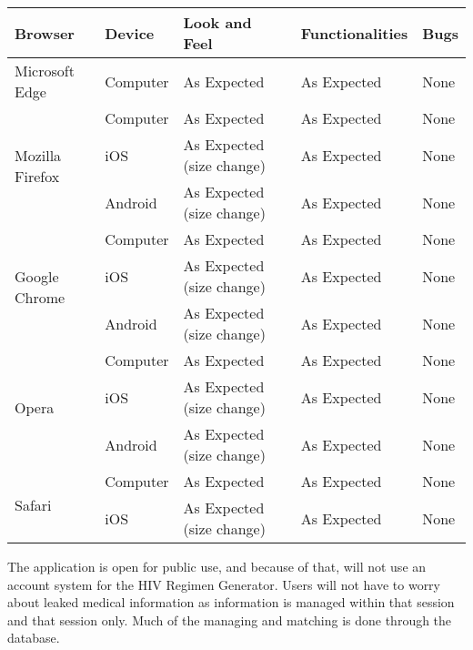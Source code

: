 \documentclass[12pt]{article}
\begin{document}
\begin{center}
    \begin{tabular}{ | l | p{3cm} | p{3cm} | p{3cm} | p{1.5cm} |}
    \hline
    \textbf{Browser} & \textbf{Device} & \textbf{Look and Feel} & \textbf{Functionalities} & \textbf{Bugs} \\ \hline
 Microsoft Edge & Computer & As Expected & As Expected & None \\ \hline

\multirow{3}{*}{Mozilla Firefox}
 & Computer & As Expected & As Expected & None \\
 & iOS & As Expected (size change) & As Expected & None \\
 & Android & As Expected (size change) & As Expected & None \\ \hline

\multirow{3}{*}{Google Chrome}
 & Computer & As Expected & As Expected & None \\
 & iOS & As Expected (size change) & As Expected & None \\
 & Android & As Expected (size change) & As Expected & None \\ \hline

\multirow{3}{*}{Opera}
 & Computer & As Expected & As Expected & None \\
 & iOS & As Expected (size change) & As Expected & None \\
 & Android & As Expected (size change) & As Expected & None \\ \hline

\multirow{2}{*}{Safari}
 & Computer & As Expected & As Expected & None \\
 & iOS & As Expected (size change) & As Expected & None \\ \hline

    \end{tabular}
\end{center}

The application is open for public use, and because of that, will not use an account system for the HIV Regimen Generator. Users will not have to worry about leaked medical information as information is managed within that session and that session only. Much of the managing and matching is done through the database.
\end{document}
